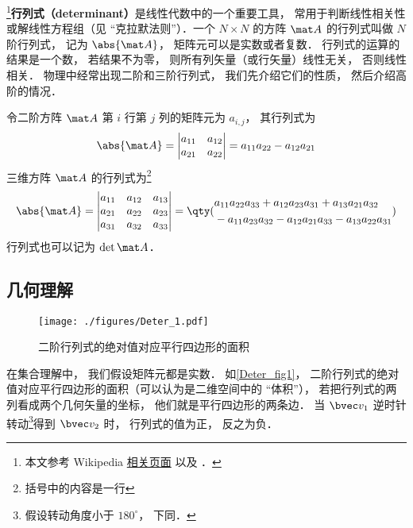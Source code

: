 

\footnote{本文参考 Wikipedia \href{https://en.wikipedia.org/wiki/Determinant}{相关页面} 以及 \cite{同济线}．}\textbf{行列式（determinant）}是线性代数中的一个重要工具， 常用于判断线性相关性 %
或解线性方程组（见 “克拉默法则”）．一个 $N\times N$ 的方阵 $\mat A$ 的行列式叫做 $N$ 阶行列式， 记为 $\abs{\mat A}$， 矩阵元可以是实数或者复数． 行列式的运算的结果是一个数， 若结果不为零， 则所有列矢量（或行矢量）线性无关， 否则线性相关． 物理中经常出现二阶和三阶行列式， 我们先介绍它们的性质， 然后介绍高阶的情况．

令二阶方阵 $\mat A$ 第 $i$ 行第 $j$ 列的矩阵元为 $a_{i,j}$， 其行列式为
\begin{equation}\label{Deter_eq1}
\abs{\mat A} =
\begin{vmatrix}
a_{11} & a_{12} \\
a_{21} & a_{22}
\end{vmatrix} = a_{11}a_{22} - a_{12}a_{21}
\end{equation}
三维方阵 $\mat A$ 的行列式为\footnote{括号中的内容是一行}
\begin{equation}\label{Deter_eq2}
\abs{\mat A} = 
\begin{vmatrix}
a_{11} & a_{12} & a_{13} \\
a_{21} & a_{22} & a_{23} \\
a_{31} & a_{32} & a_{33}
\end{vmatrix}
=
\qty(
\begin{aligned}
&a_{11}a_{22}a_{33} + a_{12}a_{23}a_{31} + a_{13}a_{21}a_{32} \\
&- a_{11}a_{23}a_{32} - a_{12}a_{21}a_{33} - a_{13}a_{22}a_{31}
\end{aligned}
)
\end{equation}
行列式也可以记为 $\det{\mat A}$．

\subsection{几何理解}

\begin{figure}[ht]
\centering
\texttt{[image: ./figures/Deter\_1.pdf]}
\caption{二阶行列式的绝对值对应平行四边形的面积} \label{Deter_fig1}
\end{figure}
在集合理解中， 我们假设矩阵元都是实数． 如\autoref{Deter_fig1}， 二阶行列式的绝对值对应平行四边形的面积（可以认为是二维空间中的 “体积”）， 若把行列式的两列看成两个几何矢量的坐标， 他们就是平行四边形的两条边． 当 $\bvec v_1$ 逆时针转动\footnote{假设转动角度小于 $180^\circ$， 下同．}得到 $\bvec v_2$ 时， 行列式的值为正， 反之为负．

